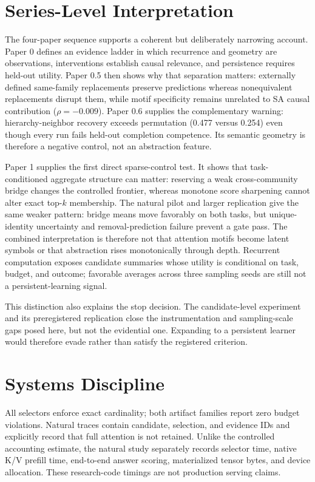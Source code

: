 \documentclass[10pt]{article}
\begin{document}
\section{Series-Level Interpretation}

The four-paper sequence supports a coherent but deliberately narrowing account. Paper 0 defines an evidence ladder in which recurrence and geometry are observations, interventions establish causal relevance, and persistence requires held-out utility. Paper 0.5 then shows why that separation matters: externally defined same-family replacements preserve predictions whereas nonequivalent replacements disrupt them, while motif specificity remains unrelated to SA causal contribution ($\rho=-0.009$). Paper 0.6 supplies the complementary warning: hierarchy-neighbor recovery exceeds permutation (0.477 versus 0.254) even though every run fails held-out completion competence. Its semantic geometry is therefore a negative control, not an abstraction feature.

Paper 1 supplies the first direct sparse-control test. It shows that task-conditioned aggregate structure can matter: reserving a weak cross-community bridge changes the controlled frontier, whereas monotone score sharpening cannot alter exact top-$k$ membership. The natural pilot and larger replication give the same weaker pattern: bridge means move favorably on both tasks, but unique-identity uncertainty and removal-prediction failure prevent a gate pass. The combined interpretation is therefore not that attention motifs become latent symbols or that abstraction rises monotonically through depth. Recurrent computation exposes candidate summaries whose utility is conditional on task, budget, and outcome; favorable averages across three sampling seeds are still not a persistent-learning signal.

This distinction also explains the stop decision. The candidate-level experiment and its preregistered replication close the instrumentation and sampling-scale gaps posed here, but not the evidential one. Expanding to a persistent learner would therefore evade rather than satisfy the registered criterion.

\section{Systems Discipline}

All selectors enforce exact cardinality; both artifact families report zero budget violations. Natural traces contain candidate, selection, and evidence IDs and explicitly record that full attention is not retained. Unlike the controlled accounting estimate, the natural study separately records selector time, native K/V prefill time, end-to-end answer scoring, materialized tensor bytes, and device allocation. These research-code timings are not production serving claims.
\end{document}
